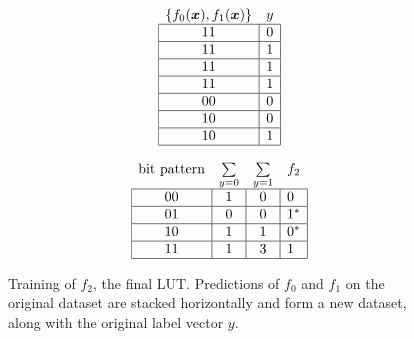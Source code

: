\begin{figure}[!htb]
\begin{minipage}{.95\linewidth}\centering
  \begin{minipage}[b]{.30\linewidth}\centering
    \begin{align*}
      \begin{array}{cc}
        \{f_0(\bm{x}),f_1(\bm{x})\}          & y          \\ \hline
        \multicolumn{1}{|c|}{11} & \multicolumn{1}{c|}{0} \\ \hline
        \multicolumn{1}{|c|}{11} & \multicolumn{1}{c|}{1} \\ \hline
        \multicolumn{1}{|c|}{11} & \multicolumn{1}{c|}{1} \\ \hline
        \multicolumn{1}{|c|}{11} & \multicolumn{1}{c|}{1} \\ \hline
        \multicolumn{1}{|c|}{00} & \multicolumn{1}{c|}{0} \\ \hline
        \multicolumn{1}{|c|}{10} & \multicolumn{1}{c|}{0} \\ \hline
        \multicolumn{1}{|c|}{10} & \multicolumn{1}{c|}{1} \\ \hline
      \end{array}
    \end{align*}
  \end{minipage}
  \begin{minipage}[b]{.4\linewidth}\centering
    \begin{align*}
      \begin{array}{cccc}
          \text{bit pattern}        & \sum\limits_{y=0}      & \multicolumn{1}{l}{\sum\limits_{y=1}} & f_2  \\ \hline
        \multicolumn{1}{|c|}{00} & \multicolumn{1}{c|}{1} & \multicolumn{1}{c|}{0} & \multicolumn{1}{l|}{0} \\ \hline
        \multicolumn{1}{|c|}{01} & \multicolumn{1}{c|}{0} & \multicolumn{1}{c|}{0} & \multicolumn{1}{l|}{1^*} \\ \hline
        \multicolumn{1}{|c|}{10} & \multicolumn{1}{c|}{1} & \multicolumn{1}{c|}{1} & \multicolumn{1}{l|}{0^*} \\ \hline
        \multicolumn{1}{|c|}{11} & \multicolumn{1}{c|}{1} & \multicolumn{1}{c|}{3} & \multicolumn{1}{l|}{1} \\ \hline
      \end{array}
    \end{align*}
  \end{minipage}
\end{minipage}
  \normalfont
  \caption{Training of $f_2$, the final LUT. Predictions of $f_0$ and $f_1$ on the original dataset are stacked horizontally and form a new dataset, along with the original label vector $y$.}
    \label{fig:ex2}
\end{figure}
\FloatBarrier

